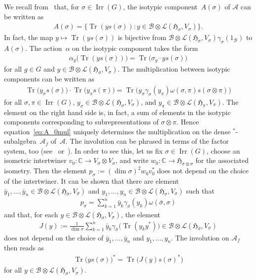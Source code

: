 \documentclass[11pt]{article}
\numberwithin{equation}{section}
\numberwithin{equation}{section}
\newcommand*{\C}{\mathbb C}		%
\newcommand*{\tensor}{\otimes}		%
\DeclareMathOperator{\Tr}{Tr}		%
\newcommand*{\Star}{$^*$\nobreakdash}
\newcommand*{\hilb}{\mathfrak}		%
\newcommand*{\alg}{\mathcal}		%
\newcommand*{\hH}{\hilb{H}}			%
\newcommand*{\one}{1}				%
\newcommand*{\aA}{\alg{A}}			%
\newcommand*{\aB}{\alg{B}} 			%
\newcommand*{\End}{\mathcal{L}} %
\DeclareMathOperator{\Irrep}{Irr} 			%
\begin{document}
We recall from~\cite{SchWa17c} that, for $\sigma \in \Irrep(G)$, the isotypic component~$A(\sigma)$ of $\aA$ can be written as
\begin{gather*}
	A(\sigma) = \bigl\{ \Tr ( y s(\sigma) )\colon y \in \aB \tensor \End(\hH_\sigma, V_\sigma) \bigr\}.
\end{gather*}
In fact, the map $y \mapsto \Tr ( y s(\sigma) )$ is bijective from $\aB \tensor \End(\hH_\sigma, V_\sigma) \gamma_\sigma(\one_\aB)$ to $A(\sigma)$.
The action~$\alpha$ on the isotypic component takes the form
\begin{gather}
	\alpha_g \bigl( \Tr ( ys(\sigma) ) \bigr) = \Tr\bigl( \sigma_g \cdot ys(\sigma) \bigr)\label{eq:A_0action}
\end{gather}
for all $g \in G$ and $y \in \aB \tensor \End(\hH_\sigma,V_\sigma)$.
The multiplication between isotypic components can be written as
	\begin{gather}
		\Tr \bigl( y_\sigma s(\sigma) \bigr) \cdot \Tr \bigl( y_\pi s(\pi) \bigr)
		=
		\Tr \bigl( y_\sigma \gamma_\sigma(y_\pi) \omega(\sigma, \pi) s(\sigma \tensor \pi) \bigr)\label{eq:A_0mul}
	\end{gather}
	for all $\sigma, \pi \in \Irrep(G)$, $y_\sigma \in \aB \tensor \End(\hH_\sigma, V_\sigma)$, and $y_\pi \in \aB \tensor \End(\hH_\pi, V_\pi)$.
The element on the right hand side is, in fact, a sum of elements in the isotypic components corresponding to subrepresentations of $\sigma \tensor \pi$.
Hence equation~\eqref{eq:A_0mul} uniquely determines the multiplication on the dense \Star-subalgebra~$\aA_f$ of~$\aA$.
The involution can be phrased in terms of the factor system, too (see~\cite[Section~5]{SchWa17c} or~\cite[Lemma~2.4]{Ne13}).
In order to see this, let us fix $\sigma \in \Irrep(G)$, choose an isometric intertwiner $v_0\colon \C \to V_{\bar\sigma} \tensor V_\sigma$, and write $w_0\colon \C \to \hH_{\bar\sigma \tensor \sigma}$ for the associated isometry.
Then the element $p_\sigma := (\dim \sigma)^2 w_0^{}v_0^*$ does not depend on the choice of the intertwiner.
It can be shown that there are element $\bar y_1, \dots, \bar y_n \in \aB \tensor \End(\hH_{\bar\sigma}, V_{\bar\sigma})$ and $y_1, \dots, y_n \in \aB \tensor \End(\hH_\sigma, V_\sigma)$ such that
\begin{gather}
	\label{eq:involution_decomposition}
	p_\sigma = \sum_{k=1}^n \bar y_k \gamma_{\bar\sigma}(y_k) \omega(\bar \sigma, \sigma)
\end{gather}
and that, for each $y \in \aB \tensor \End(\hH_\sigma, V_\sigma)$, the element
\begin{gather*}
	J(y) := \frac{1}{\dim \sigma}\sum_{k=1}^n \bar y_k \gamma_{\bar\sigma} \bigl( \Tr(y_k y^*) \bigr) \in \aB \tensor \End(\hH_{\bar\sigma}, V_{\bar \sigma})
\end{gather*}
does not depend on the choice of $\bar y_1, \dots, \bar y_n$ and $y_1, \dots, y_n$.
The involution on $\aA_f$ then reads as
\begin{gather*}
	\Tr \bigl( y s(\sigma) \bigr)^* = \Tr \bigl( J(y) s(\sigma)^* \bigr)
\end{gather*}
for all $y \in \aB \tensor \End(\hH_\sigma, V_\sigma)$.
\end{document}
